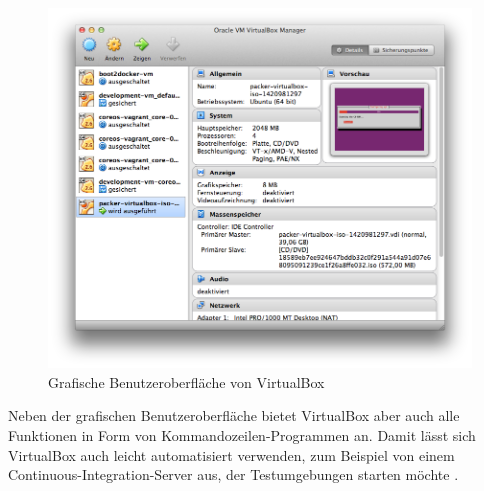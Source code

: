 \begin{figure}[!ht]
  \begin{center}
    \includegraphics[width=14cm]{bilder/virtualbox-gui.png}
    \caption{Grafische Benutzeroberfläche von VirtualBox}
  \end{center}
\end{figure}

Neben der grafischen Benutzeroberfläche bietet VirtualBox aber auch alle Funktionen in Form von Kommandozeilen-Programmen an. Damit lässt sich VirtualBox auch leicht automatisiert verwenden, zum Beispiel von einem Continuous-Integration-Server aus, der Testumgebungen starten möchte \citep[Vgl.][S. 113]{Oracle14}.


